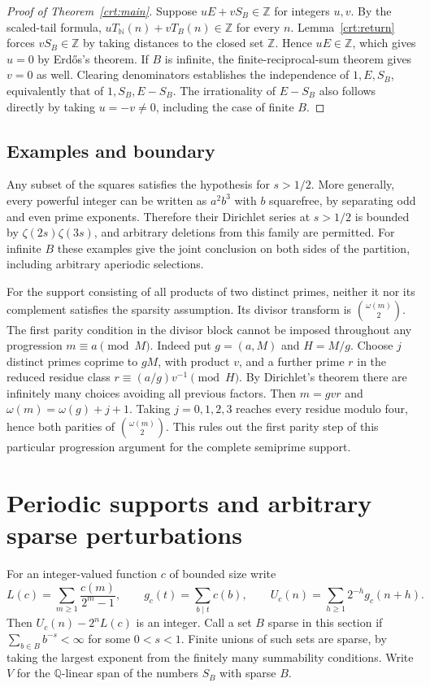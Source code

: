 \documentclass[11pt,letterpaper]{article}
\newcommand{\Z}{\mathbb Z}
\newcommand{\N}{\mathbb N}
\begin{document}
\begin{proof}[Proof of Theorem~\ref{crt:main}]
Suppose $uE+vS_B\in\Z$ for integers $u,v$. By the scaled-tail formula, $uT_{\N}(n)+vT_B(n)\in\Z$ for every $n$. Lemma~\ref{crt:return} forces $vS_B\in\Z$ by taking distances to the closed set $\Z$. Hence $uE\in\Z$, which gives $u=0$ by Erd\H{o}s's theorem. If $B$ is infinite, the finite-reciprocal-sum theorem gives $v=0$ as well. Clearing denominators establishes the independence of $1,E,S_B$, equivalently that of $1,S_B,E-S_B$. The irrationality of $E-S_B$ also follows directly by taking $u=-v\ne0$, including the case of finite $B$.
\end{proof}

\subsection{Examples and boundary}
Any subset of the squares satisfies the hypothesis for $s>1/2$. More generally, every powerful integer can be written as $a^2b^3$ with $b$ squarefree, by separating odd and even prime exponents. Therefore their Dirichlet series at $s>1/2$ is bounded by $\zeta(2s)\zeta(3s)$, and arbitrary deletions from this family are permitted. For infinite $B$ these examples give the joint conclusion on both sides of the partition, including arbitrary aperiodic selections.

For the support consisting of all products of two distinct primes, neither it nor its complement satisfies the sparsity assumption. Its divisor transform is $\binom{\omega(m)}{2}$. The first parity condition in the divisor block cannot be imposed throughout any progression $m\equiv a\pmod{M}$. Indeed put $g=(a,M)$ and $H=M/g$. Choose $j$ distinct primes coprime to $gM$, with product $v$, and a further prime $r$ in the reduced residue class $r\equiv (a/g)v^{-1}\pmod H$. By Dirichlet's theorem there are infinitely many choices avoiding all previous factors. Then $m=gvr$ and $\omega(m)=\omega(g)+j+1$. Taking $j=0,1,2,3$ reaches every residue modulo four, hence both parities of $\binom{\omega(m)}{2}$. This rules out the first parity step of this particular progression argument for the complete semiprime support.


\section{Periodic supports and arbitrary sparse perturbations}
\label{sec:sparse-transfer}
For an integer-valued function $c$ of bounded size write
\[
 L(c)=\sum_{m\ge1}\frac{c(m)}{2^m-1},\qquad
 g_c(t)=\sum_{b\mid t}c(b),\qquad
 U_c(n)=\sum_{h\ge1}2^{-h}g_c(n+h).
\]
Then $U_c(n)-2^nL(c)$ is an integer. Call a set $B$ sparse in this
section if $\sum_{b\in B}b^{-s}<\infty$ for some $0<s<1$.
Finite unions of such sets are sparse, by taking the largest exponent
from the finitely many summability conditions. Write $V$ for the
$\mathbb Q$-linear span of the numbers $S_B$ with sparse $B$.
\end{document}

